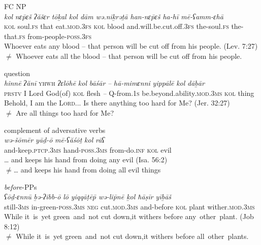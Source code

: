 \documentclass[output=paper]{langsci/langscibook}
\begin{document}
\ea%
    FC NP\label{ex:doron:39}\\
    \gll \textit{kol}   \textit{nɛ\={p}ɛš   ʔăšɛr tōḵal             kol  dām     wə.niḵrəṯā                     han-nɛ\={p}ɛš   ha-hī         mē-ʕamm-ɛhā}\\
         \textsc{kol} soul.\textsc{fs} that   eat.\textsc{mod.3fs} \textsc{kol}  blood and.will.be.cut.off.\textsc{3fs}  the-soul.\textsc{fs} the-that.\textsc{fs} from-people{}-\textsc{poss.3fs}\\
    \glt Whoever eats any blood – that person will be cut off from his people. (Lev. 7:27)\\${\neq}$  Whoever eats all the blood – that person will be cut off from his people.
    \z

\ea%
    question\label{ex:doron:40}\\
    \gll \textit{hinnē}  \textit{ʔănī} \textsc{yhwh}  \textit{ʔɛlōhē}   \textit{kol}   \textit{bāśār} \textit{–}  \textit{hā-mimɛnni}  \textit{yippālē}                                  \textit{kol}   \textit{dāḇār}\\
         \textsc{prstv} I      Lord    God(of) \textsc{kol} flesh  \textit{–}  Q-from.1\textsc{s}    be.beyond.ability.\textsc{mod.3ms}  \textsc{kol} thing \\
    \glt Behold, I am the \textsc{\textsc{L}ord}... Is there anything too hard for Me? (Jer. 32:27)\\${\neq}$   Are all things too hard for Me?
    \z

\ea%
    complement of adversative verbs\label{ex:doron:41}\\
    \gll \textit{wə-šōmēr}                  \textit{yāḏ-ō}                 \textit{mē-ʕăśōṯ}      \textit{kol}   \textit{rāʕ}\\
         and-keep.\textsc{ptcp.3ms}  hand{}-\textsc{poss.3ms} from-do.\textsc{inf}  \textsc{kol} evil \\
    \glt … and keeps his hand from doing any evil  (Isa. 56:2)\\${\neq}$… and keeps his hand from doing all evil things
    \z

\ea%
    \textit{before}{}-PPs\label{ex:doron:42}\\
    \gll \textit{ʕōḏ-ɛnnū}  \textit{ḇə-ʔibb-ō}                \textit{lō}     \textit{yiqqāṭē}\textit{\={p}         \textit{wə-li}}\textit{\={p}\textit{nē}       \textit{ḵol}   \textit{ħāṣīr}  \textit{yīḇāš}}\\
         still-\textsc{3ms} in-green-\textsc{poss.3ms}  \textsc{neg}   cut.\textsc{mod.3ms}  and-before  \textsc{kol} plant  wither.\textsc{mod.3ms}\\
    \glt While it~is~yet green~and~not cut down,it withers before any~other~plant. (Job 8:12)\\${\neq}$  While it~is~yet green~and~not cut down,it withers before all~other~plants.
    \z
\end{document}
